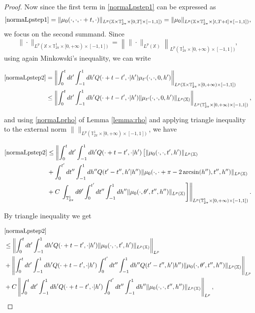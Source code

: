 \documentclass[a4paper,10pt,reqno]{amsart}
\numberwithin{equation}{subsection}
\numberwithin{figure}{subsection}
\begin{document}
\begin{proof}
Now since the first term in \eqref{normaLpstep1} can be expressed as
\[
\eqref{normaLpstep1}=\|\mu_0(\cdot,\cdot,\cdot+t,\cdot)\|_{L^p(\mathbb{X}\times\mathbb{T}^1_{2\pi}\times[0,T]\times[-1,1])}=\|\mu_0\|_{L^p(\mathbb{X}\times\mathbb{T}^1_{2\pi}\times[t,T+t]\times[-1,1])},
\]
we focus on the second summand. Since
\[
\|\cdot\|_{L^p(\mathbb{X}\times\mathbb{T}^1_{2\pi}\times[0,+\infty)\times[-1,1])}=\left\|\|\cdot\|_{L^p(\mathbb{X})}\right\|_{L^p(\mathbb{T}^1_{2\pi}\times[0,+\infty)\times[-1,1])},
\]
using again Minkowski's inequality, we can write

\begin{align*}
\eqref{normaLpstep2}&=\left\|\int_0^tdt'\int_{-1}^1dh'Q(\cdot+t-t',\cdot|h')\mu_{t'}(\cdot,\cdot,0,h')\right\|_{L^p(\mathbb{X}\times\mathbb{T}^1_{2\pi}\times[0,+\infty)\times[-1,1])}
\\
&\leq\left\|\int_0^tdt'\int_{-1}^1dh'Q(\cdot+t-t',\cdot|h')\|\mu_{t'}(\cdot,\cdot,0,h')\|_{L^p(\mathbb{X})}\right\|_{L^p(\mathbb{T}^1_{2\pi}\times[0,+\infty)\times[-1,1])},
\end{align*}

and using \eqref{normaLprho} of Lemma \ref{lemma:rho} and applying triangle inequality to the external norm $\|\|_{L^p(\mathbb{T}^1_{2\pi}\times[0,+\infty)\times[-1,1])}$, we have

\begin{align*}
\eqref{normaLpstep2}&\leq\left\|\int_0^tdt'\int_{-1}^1dh'Q(\cdot+t-t',\cdot|h')\left[\|\mu_0(\cdot,\cdot,t',h')\|_{L^p(\mathbb{X})}\right.\right.
\\
&+\int_0^{t'}dt''\int_{-1}^1dh''Q(t'-t'',h'|h'')\|\mu_0(\cdot,\cdot+\pi-2\arcsin(h''),t'',h'')\|_{L^p(\mathbb{X})}
\\
&+C\left.\left.\int_{\mathbb{T}^1_{2\pi}}d\theta'\int_0^{t'}dt''\int_{-1}^1dh''\|\mu_0(\cdot,\theta',t'',h'')\|_{L^p(\mathbb{X})}\right]\right\|_{L^p(\mathbb{T}^1_{2\pi}\times[0,+\infty)\times[-1,1])}.
\end{align*}

By triangle inequality we get

{\footnotesize\begin{align}
\nonumber&\eqref{normaLpstep2}
\\
\label{normaLpstep3}&\leq\left\|\int_0^tdt'\int_{-1}^1dh'Q(\cdot+t-t',\cdot|h')\|\mu_0(\cdot,\cdot,t',h')\|_{L^p(\mathbb{X})}\right\|_{L^p}
\\
\label{normaLpstep5}&+\left\|\int_0^tdt'\int_{-1}^1dh'Q(\cdot+t-t',\cdot|h')\int_0^{t'}dt''\int_{-1}^1dh'' Q(t'-t'',h'|h'')\|\mu_0(\cdot,\theta',t'',h'')\|_{L^p(\mathbb{X})}\right\|_{L^p}
\\
\label{normaLpstep4}&+C\left\|\int_0^tdt'\int_{-1}^1dh'Q(\cdot+t-t',\cdot|h')\int_0^{t'}dt''\int_{-1}^1dh''\|\mu_0(\cdot,\cdot,t'',h'')\|_{L^p(\mathbb{X})}\right\|_{L^p},
\end{align}}


\end{proof}
\end{document}
